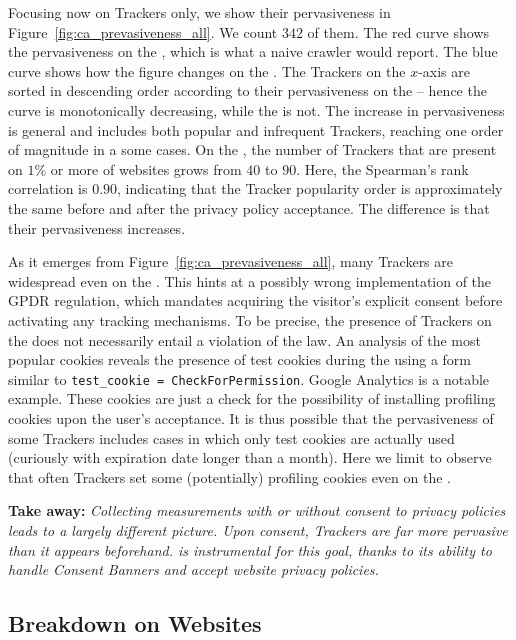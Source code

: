 Focusing now on Trackers only, we show their pervasiveness in Figure~\ref{fig:ca_prevasiveness_all}. We count $342$ of them. The red curve shows the pervasiveness on the \BEFORE, which is what a naive crawler would report. The blue curve shows how the figure changes on the \AFTER. The Trackers on the $x$-axis are sorted in descending order according to their pervasiveness on the \BEFORE -- hence the \BEFORE curve is monotonically decreasing, while the \AFTER is not. The increase in pervasiveness is general and includes both popular and infrequent Trackers, reaching one order of magnitude in a some cases. On the \AFTER, the number of Trackers that are present on $1\%$ or more of websites grows from $40$ to $90$.
Here, the Spearman's rank correlation is $0.90$, indicating that the Tracker popularity order is approximately the same before and after the privacy policy acceptance. The difference is that their pervasiveness increases.

As it emerges from Figure~\ref{fig:ca_prevasiveness_all}, many Trackers are widespread even on the \BEFORE. This hints at a possibly wrong implementation of the GPDR regulation, which mandates acquiring the visitor's explicit consent before activating any tracking mechanisms. To be precise, the presence of Trackers on the \BEFORE does not necessarily entail a violation of the law. An analysis of the most popular cookies reveals the presence of test cookies during the \BEFORE using a form similar to \texttt{test\_cookie = CheckForPermission}. Google Analytics is a notable example. These cookies are just a check for the possibility of installing profiling cookies upon the user's acceptance. It is thus possible that the \BEFORE pervasiveness of some Trackers includes cases in which only test cookies are actually used (curiously with expiration date longer than a month). Here we limit to observe that often Trackers set some (potentially) profiling cookies even on the \BEFORE.

\textbf{Take away:} 
\textit{Collecting measurements with or without consent to privacy policies leads to a largely different picture. Upon consent, Trackers are far more pervasive than it appears beforehand. \TOOL is instrumental for this goal, thanks to its ability to handle Consent Banners and accept website privacy policies.}


\subsection{Breakdown on Websites}

